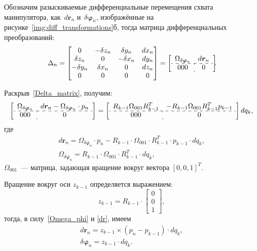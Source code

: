 Обозначим разыскиваемые дифференциальные перемещения  схвата манипулятора, как~$ d \bm{r}_n $ и~$\delta\bm{\varphi}_n $, изображённые на рисунке~\ref{img:diff_transformations}б, тогда матрица дифференциальных преобразований:
\begin{equation}
	\Delta_n =
	\begin{bmatrix}
		0 & - \delta z_n & \delta y_n & d x_n \\
		\delta z_n & 0 & -\delta x_n & d y_n \\
		-\delta y_n & \delta x_n & 0 & d z_n \\
		0 & 0 & 0 & 0
	\end{bmatrix}
	=
	\left[
	\begin{array}{c:c}
	\Omega_{\delta\bm{\varphi}_n} & d \bm{r}_n \\ \hdashline
	000 &  0
	\end{array}
	\right]\!\!\!.
\end{equation}

Раскрыв~\eqref{Delta_matrix}, получим:
\begin{equation}
	\left[
	\begin{array}{c:c}
		\Omega_{\delta\bm{\varphi}_n} & d\bm{r}_n - \Omega_{\delta\bm{\varphi}_n} \cdot {p}_n \\ \hdashline
		000 &  0
	\end{array}
	\right]
	=
	\left[
	\begin{array}{c:c}
		R_{k-1} \Omega_{001} R_{k-1}^T & - R_{k-1} \Omega_{001} R_{k-1}^T {p}_{k-1} \\ \hdashline
		000 &  0
	\end{array}
	\right]
	dq_k,
\end{equation}
где 
\begin{gather}
	\label{dr}
	d\bm{r}_n = \Omega_{\delta\bm{\varphi}_n} \cdot {p}_n - R_{k-1} \cdot \Omega_{001} \cdot R_{k-1}^T \cdot {p}_{k-1} \cdot dq_k, \\
	\label{Omega_phi}
	\Omega_{\delta\bm{\varphi}_n} = R_{k-1} \cdot \Omega_{001} \cdot R_{k-1}^T \cdot dq_k,
\end{gather}
$ \Omega_{001} $~--- матрица, задающая вращение вокруг вектора $ [0,0,1]^T $.

Вращение вокруг оси $ z_{k-1} $ определяется выражением:
\begin{equation}
	z_{k-1} = R_{k-1} \cdot
	\begin{bmatrix}
	0 \\ 0 \\ 1
	\end{bmatrix}\!\!\!,
\end{equation}
тогда, в силу~\eqref{Omega_phi} и \eqref{dr}, имеем
\begin{gather}
	\label{diff_dr}
	d\bm{r}_n = z_{k-1} \times (p_n - p_{k-1}) \cdot dq_k, \\
	\label{diff_delta_phi}
	\delta\bm{\varphi}_n = z_{k-1} \cdot dq_k.
\end{gather}

